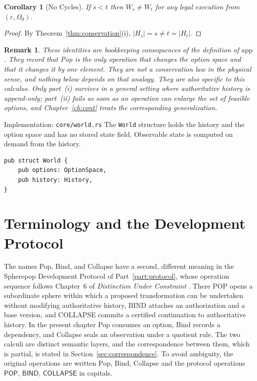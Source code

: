 \documentclass[12pt,oneside,openany]{book}
\theoremstyle{spherepop}
\newtheorem{corollary}[definition]{Corollary}
\theoremstyle{remarkstyle}
\newtheorem{remark}[definition]{Remark}
\newcommand{\Pop}{\mathrm{Pop}}
\newcommand{\Bind}{\mathrm{Bind}}
\newcommand{\Col}{\mathrm{Collapse}}
\begin{document}
\begin{corollary}[No Cycles]
\label{cor:irrev}
If $s<t$ then $W_s\neq W_t$ for any legal execution from $(\varepsilon,\Omega_0)$.
\end{corollary}

\begin{proof}
By Theorem~\ref{thm:conservation}(i), $|H_s|=s\ne t=|H_t|$.
\end{proof}

\begin{remark}
These identities are bookkeeping consequences of the definition of $\mathrm{app}$. They record that Pop is the only operation that changes the option space and that it changes it by one element. They are not a conservation law in the physical sense, and nothing below depends on that analogy. They are also specific to this calculus. Only part~(i) survives in a general setting where authoritative history is append-only; part~(ii) fails as soon as an operation can enlarge the set of feasible options, and Chapter~\ref{ch:cont} treats the corresponding generalization.
\end{remark}

\begin{implbox}{Implementation: \texttt{core/world.rs}}
The \texttt{World} structure holds the history and the option space and has no stored state field. Observable state is computed on demand from the history.
\begin{lstlisting}
pub struct World {
    pub options: OptionSpace,
    pub history: History,
}
\end{lstlisting}
\end{implbox}

\section{Terminology and the Development Protocol}
\label{sec:terminology}

The names Pop, Bind, and Collapse have a second, different meaning in the Spherepop Development Protocol of Part~\ref{part:protocol}, whose operation sequence follows Chapter~6 of \emph{Distinction Under Constraint} \cite{duc}. There POP opens a subordinate sphere within which a proposed transformation can be undertaken without modifying authoritative history, BIND attaches an authorization and a base version, and COLLAPSE commits a certified continuation to authoritative history. In the present chapter Pop consumes an option, Bind records a dependency, and Collapse seals an observation under a quotient rule. The two calculi are distinct semantic layers, and the correspondence between them, which is partial, is stated in Section~\ref{sec:correspondence}. To avoid ambiguity, the original operations are written $\Pop$, $\Bind$, $\Col$ and the protocol operations $\mathsf{POP}$, $\mathsf{BIND}$, $\mathsf{COLLAPSE}$ in capitals.
\end{document}
